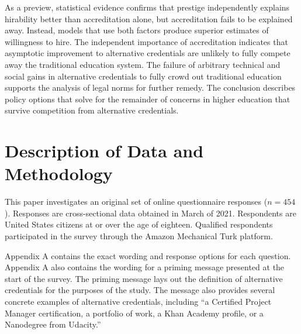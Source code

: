 \documentclass[review]{elsarticle}
\begin{document}

As a preview, statistical evidence confirms that prestige independently explains hirability better than accreditation alone,
but accreditation fails to be explained away.
Instead, models that use both factors produce superior estimates of willingness to hire.
The independent importance of accreditation indicates that asymptotic improvement to alternative credentials
are unlikely to fully compete away the traditional education system.
The failure of arbitrary technical and social gains in alternative credentials to fully crowd out traditional education
supports the analysis of legal norms for further remedy.
The conclusion describes policy options that solve for the remainder of concerns in higher education that survive competition from alternative credentials.

\section{Description of Data and Methodology}

This paper investigates an original set of online questionnaire responses ($n = 454$).
Responses are cross-sectional data obtained in March of 2021.
Respondents are United States citizens at or over the age of eighteen.
Qualified respondents participated in the survey through the Amazon Mechanical Turk platform.

Appendix A contains the exact wording and response options for each question.
Appendix A also contains the wording for a priming message presented at the start of the survey.
The priming message lays out the definition of alternative credentials for the purposes of the study.
The message also provides several concrete examples of alternative credentials,
including ``a Certified Project Manager certification,
a portfolio of work, a Khan Academy profile, or a Nanodegree from Udacity.''
\end{document}
